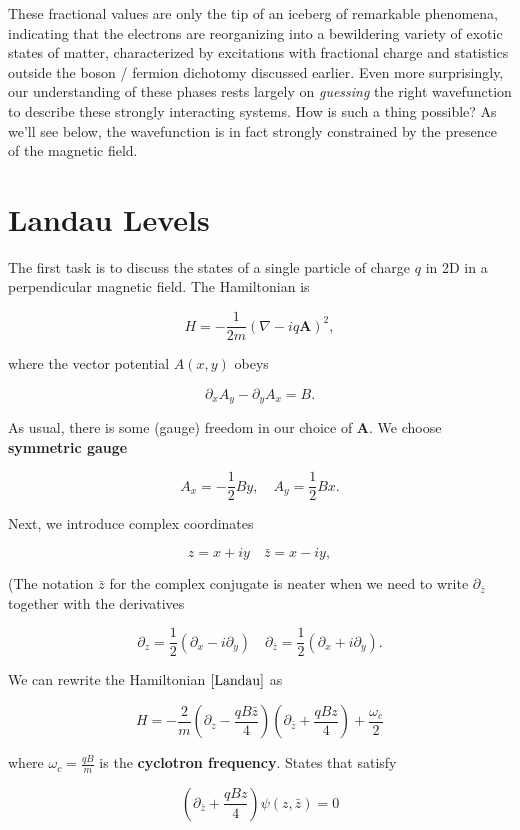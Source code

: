 \documentclass[
  letterpaper,
  DIV=11,
  numbers=noendperiod]{scrreprt}
\begin{document}
These fractional values are only the tip of an iceberg of remarkable
phenomena, indicating that the electrons are reorganizing into a
bewildering variety of exotic states of matter, characterized by
excitations with fractional charge and statistics outside the boson /
fermion dichotomy discussed earlier. Even more surprisingly, our
understanding of these phases rests largely on \emph{guessing} the right
wavefunction to describe these strongly interacting systems. How is such
a thing possible? As we'll see below, the wavefunction is in fact
strongly constrained by the presence of the magnetic field.

\section{Landau Levels}\label{landau-levels}

The first task is to discuss the states of a single particle of charge
\(q\) in 2D in a perpendicular magnetic field. The Hamiltonian is

\[
H = -\frac{1}{2m}\left(\nabla -i q \mathbf{A}\right)^2,
\label{Landau}
\]

where the vector potential \(A(x,y)\) obeys

\[
\partial_x A_y - \partial_y A_x = B.
\]

As usual, there is some (gauge) freedom in our choice of \(\mathbf{A}\).
We choose \textbf{symmetric gauge}

\[
A_x = -\frac{1}{2} B y,\quad A_y = \frac{1}{2} B x.
\]

Next, we introduce complex coordinates

\[
z = x + i y \quad \bar z  = x - iy,
\]

(The notation \(\bar z\) for the complex conjugate is neater when we
need to write \(\partial_{\bar z}\) together with the derivatives

\[
\partial_z = \frac{1}{2}\left(\partial_x - i\partial_y\right) \quad \partial_{\bar z} = \frac{1}{2}\left(\partial_x + i\partial_y\right).
\]

We can rewrite the Hamiltonian \(\eqref{Landau}\) as

\[
H = -\frac{2}{m}\left(\partial_z -\frac{qB \bar z}{4}\right)\left(\partial_{\bar z} +\frac{qB z}{4}\right) + \frac{\omega_c}{2}
\]

where \(\omega_c = \frac{qB}{m}\) is the \textbf{cyclotron frequency}.
States that satisfy

\[
\left(\partial_{\bar z} +\frac{qB z}{4}\right)\psi(z,\bar z) = 0
\]
\end{document}

